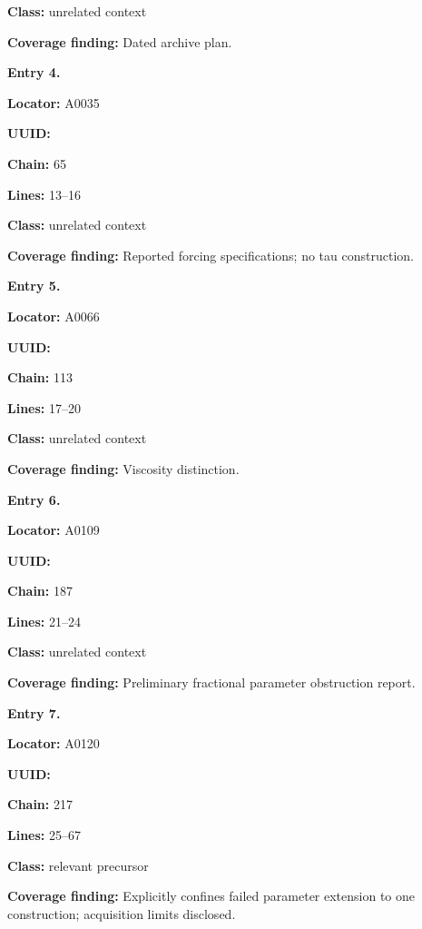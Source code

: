 \documentclass[10pt,a4paper,oneside]{report}
\begin{document}
\textbf{Class:} unrelated context

\textbf{Coverage finding:} Dated archive plan.


\textbf{Entry 4.}

\textbf{Locator:} A0035

\textbf{UUID:} \protect{}

\textbf{Chain:} 65

\textbf{Lines:} 13--16

\textbf{Class:} unrelated context

\textbf{Coverage finding:} Reported forcing specifications; no tau
construction.


\textbf{Entry 5.}

\textbf{Locator:} A0066

\textbf{UUID:} \protect{}

\textbf{Chain:} 113

\textbf{Lines:} 17--20

\textbf{Class:} unrelated context

\textbf{Coverage finding:} Viscosity distinction.


\textbf{Entry 6.}

\textbf{Locator:} A0109

\textbf{UUID:} \protect{}

\textbf{Chain:} 187

\textbf{Lines:} 21--24

\textbf{Class:} unrelated context

\textbf{Coverage finding:} Preliminary fractional parameter obstruction
report.


\textbf{Entry 7.}

\textbf{Locator:} A0120

\textbf{UUID:} \protect{}

\textbf{Chain:} 217

\textbf{Lines:} 25--67

\textbf{Class:} relevant precursor

\textbf{Coverage finding:} Explicitly confines failed parameter
extension to one construction; acquisition limits disclosed.
\end{document}
